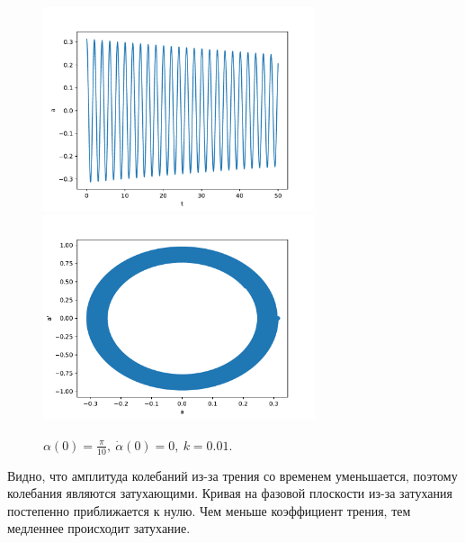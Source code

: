             \begin{figure}[H]
                \centering
                \includegraphics[width=8cm]{pictures/3resonance2.pdf}
                \includegraphics[width=8cm]{pictures/3resonance2p.pdf}
                \caption{$\alpha(0) = \frac{\pi}{10}, ~ \dot{\alpha}(0) = 0, ~ k = 0.01$.}
            \end{figure}

            Видно, что амплитуда колебаний из-за трения со временем уменьшается, поэтому колебания являются затухающими. Кривая на фазовой плоскости из-за затухания постепенно приближается к нулю. Чем меньше коэффициент трения, тем медленнее происходит затухание.

